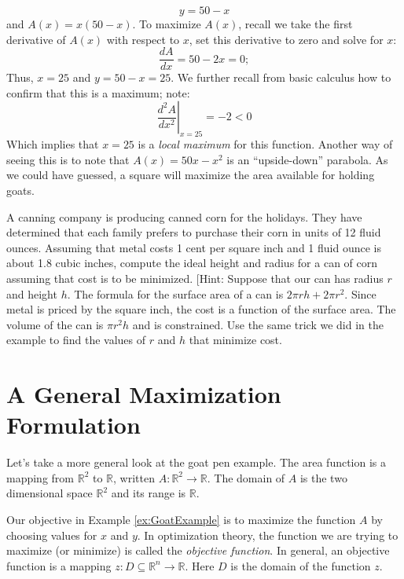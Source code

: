 \begin{example}
\begin{equation}
y = 50 - x
\end{equation}
and $A(x) = x(50-x)$. To maximize $A(x)$, recall we take the first derivative of $A(x)$ with respect to $x$, set this derivative to zero and solve for $x$:
\begin{equation}
\frac{dA}{dx} = 50-2x = 0;
\end{equation}
Thus, $x = 25$ and $y = 50-x = 25$. We further recall from basic calculus how to confirm that this is a maximum; note:
\begin{equation}
\left.\frac{d^2A}{dx^2}\right|_{x = 25} = -2 < 0
\end{equation}
Which implies that $x = 25$ is a \textit{local maximum} for this function. Another way of seeing this is to note that $A(x) = 50x-x^2$ is an ``upside-down'' parabola. As we could have guessed, a square will maximize the area available for holding goats. 
\label{ex:GoatExample}
\end{example}

\begin{exercise} A canning company is producing canned corn for the holidays. They have determined that each family prefers to purchase their corn in units of 12 fluid ounces. Assuming that metal costs 1 cent per square inch and 1 fluid ounce is about 1.8 cubic inches, compute the ideal height and radius for a can of corn assuming that cost is to be minimized. [Hint: Suppose that our can has radius $r$ and height $h$. The formula for the surface area of a can is $2\pi r h + 2 \pi r^2$. Since metal is priced by the square inch, the cost is a function of the surface area. The volume of the can is $\pi r ^2 h$ and is constrained. Use the same trick we did in the example to find the values of $r$ and $h$ that minimize cost.
\label{exer:Can}
\end{exercise}

\section{A General Maximization Formulation}
Let's take a more general look at the goat pen example. The area function is a mapping from $\mathbb{R}^2$ to $\mathbb{R}$, written $A : \mathbb{R}^2 \rightarrow \mathbb{R}$. The domain of $A$ is the two dimensional space $\mathbb{R}^2$ and its range is $\mathbb{R}$.

Our objective in Example \ref{ex:GoatExample} is to maximize the function $A$ by choosing values for $x$ and $y$. In optimization theory, the function we are trying to maximize (or minimize) is called the \textit{objective function}. In general, an objective function is a mapping $z: D \subseteq \mathbb{R}^n \rightarrow \mathbb{R}$. Here $D$ is the domain of the function $z$. 

